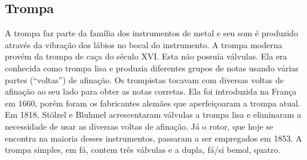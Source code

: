 \subsection*{Trompa}

A trompa faz parte da família dos instrumentos de metal e seu
som é produzido através da vibração dos lábios no bocal do
instrumento. A trompa moderna provém da trompa de caça do século
XVI. Esta não possuía válvulas. Ela era conhecida como trompa lisa e
produzia diferentes grupos de notas usando várias partes (“voltas”)
de afinação. Os trompistas tocavam com diversas voltas de afinação ao
seu lado para obter as notas corretas. Ela foi introduzida na França
em 1660, porém foram os fabricantes alemães que aperfeiçoaram a trompa
atual. Em 1818, Stölzel e Bluhmel acrescentaram válvulas a trompa lisa
e eliminaram a necessidade de usar as diversas voltas de afinação. Já
o rotor, que hoje se encontra na maioria desses instrumentos, passaram
a ser empregados em 1853. A trompa simples, em fá, contem três
válvulas e a dupla, fá/si bemol, quatro.